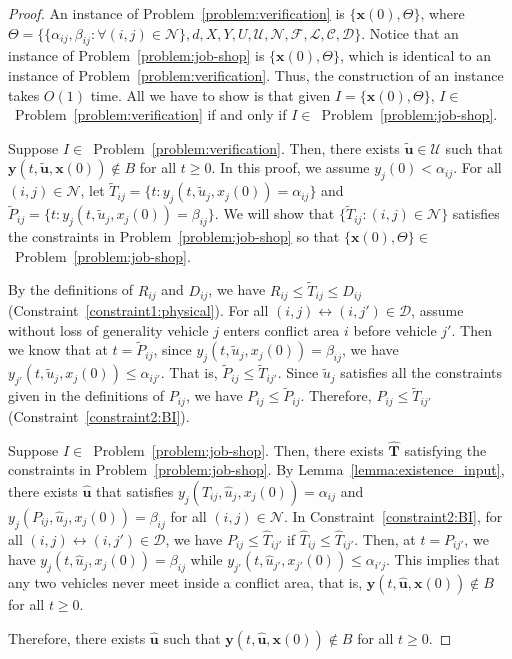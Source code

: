 \documentclass{sig-alternate}
\begin{document}
\begin{proof}
An instance of Problem~\ref{problem:verification} is $\{\mathbf{x}(0),\Theta\}$, where  $\Theta=\{\{\alpha_{ij}, \beta_{ij}: \forall (i,j)\in\mathcal{N}\}, d, X,Y, U, \mathcal{U, N,F,L,C,D}\}$. 
Notice that an instance of Problem~\ref{problem:job-shop} is $\{\mathbf{x}(0),\Theta\}$, which is identical to an instance of Problem~\ref{problem:verification}. Thus, the construction of an instance takes $O(1)$ time. All we have to show is that given $I=\{\mathbf{x}(0),\Theta\}$, $I\in$~Problem~\ref{problem:verification} if and only if $I\in$~Problem~\ref{problem:job-shop}.

Suppose $I\in$~Problem~\ref{problem:verification}. Then, there exists $\tilde{\mathbf{u}}\in \mathcal{U}$ such that $\mathbf{y}(t,\tilde{\mathbf{u}},\mathbf{x}(0))\notin B$ for all $t\geq 0$. In this proof, we assume $y_j(0)<\alpha_{ij}$. For all $(i,j)\in\mathcal{N}$, let $\tilde{T}_{ij}=\{t:y_j(t,\tilde{u}_j,x_j(0))=\alpha_{ij}\}$ and $\tilde{P}_{ij} = \{t:y_j(t,\tilde{u}_j,x_j(0))=\beta_{ij}\}$. We will show that $\{\tilde{T}_{ij}:(i,j)\in\mathcal{N}\}$ satisfies the constraints in Problem~\ref{problem:job-shop} so that $\{\mathbf{x}(0),\Theta\}\in$~Problem~\ref{problem:job-shop}.

By the definitions of $R_{ij}$ and $D_{ij}$, we have $R_{ij}\leq \tilde{T}_{ij}\leq D_{ij}$ (Constraint~\eqref{constraint1:physical}). For all $(i,j)\leftrightarrow (i,j')\in\mathcal{D}$, assume without loss of generality vehicle $j$ enters conflict area $i$ before vehicle $j'$. Then we know that at $t=\tilde{P}_{ij}$, since $y_j(t,\tilde{u}_j,x_j(0))=\beta_{ij}$, we have $y_{j'}(t,\tilde{u}_j,x_j(0))\leq \alpha_{ij'}$. That is, $\tilde{P}_{ij} \leq \tilde{T}_{ij'}$. Since $\tilde{u}_j$ satisfies all the constraints given in the definitions of $P_{ij}$, we have $P_{ij}\leq \tilde{P}_{ij}$. Therefore, $P_{ij}\leq \tilde{T}_{ij'}$ (Constraint~\eqref{constraint2:BI}). 


Suppose $I\in$~Problem~\ref{problem:job-shop}. Then, there exists $\hat{\mathbf{T}}$ satisfying the constraints in Problem~\ref{problem:job-shop}. By Lemma~\ref{lemma:existence_input}, there exists $\hat{\mathbf{u}}$ that satisfies $y_j(\hat{T}_{ij},\hat{u}_j,x_j(0))=\alpha_{ij}$ and $ y_j(P_{ij},\hat{u}_j,x_j(0))=\beta_{ij}$ for all $(i,j)\in\mathcal{N}$. In Constraint~\eqref{constraint2:BI}, for all $(i,j)\leftrightarrow(i,j')\in \mathcal{D}$, we have $P_{ij}\leq \hat{T}_{ij'}$ if $\hat{T}_{ij}\leq \hat{T}_{ij'}$. Then, at $t={P}_{ij'}$, we have $y_j(t,\hat{u}_j,x_j(0))=\beta_{ij}$ while $y_{j'}(t,\hat{u}_{j'},x_{j'}(0))\leq\alpha_{i'j}$. This implies that any two vehicles never meet inside a conflict area, that is, $\mathbf{y}(t,\hat{\mathbf{u}},\mathbf{x}(0))\notin B$ for all $t\geq 0$. 

Therefore, there exists $\hat{\mathbf{u}}$ such that $\mathbf{y}(t,\hat{\mathbf{u}},\mathbf{x}(0))\notin B$ for all $t\geq 0$.
\end{proof}
\end{document}
